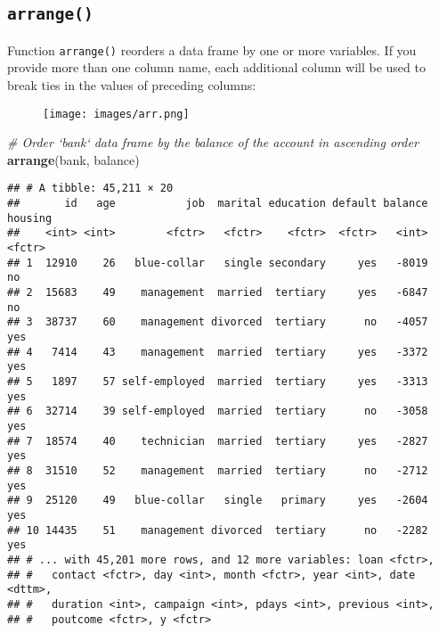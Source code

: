 \documentclass[]{book}
\newenvironment{Shaded}{\begin{snugshade}}{\end{snugshade}}
\newcommand{\KeywordTok}[1]{\textcolor[rgb]{0.13,0.29,0.53}{\textbf{{#1}}}}
\newcommand{\StringTok}[1]{\textcolor[rgb]{0.31,0.60,0.02}{{#1}}}
\newcommand{\CommentTok}[1]{\textcolor[rgb]{0.56,0.35,0.01}{\textit{{#1}}}}
\newcommand{\NormalTok}[1]{{#1}}
\begin{document}
\subsection{\texorpdfstring{\texttt{arrange()}}{arrange()}}\label{arrange}

Function \texttt{arrange()} reorders a data frame by one or more
variables. If you provide more than one column name, each additional
column will be used to break ties in the values of preceding columns:

\begin{figure}[htbp]
\centering
\texttt{[image: images/arr.png]}
\caption{}
\end{figure}

\begin{Shaded}
\begin{Highlighting}[]
\CommentTok{# Order `bank` data frame by the balance of the account in ascending order}
\KeywordTok{arrange}\NormalTok{(bank, balance)}
\end{Highlighting}
\end{Shaded}

\begin{verbatim}
## # A tibble: 45,211 × 20
##       id   age           job  marital education default balance housing
##    <int> <int>        <fctr>   <fctr>    <fctr>  <fctr>   <int>  <fctr>
## 1  12910    26   blue-collar   single secondary     yes   -8019      no
## 2  15683    49    management  married  tertiary     yes   -6847      no
## 3  38737    60    management divorced  tertiary      no   -4057     yes
## 4   7414    43    management  married  tertiary     yes   -3372     yes
## 5   1897    57 self-employed  married  tertiary     yes   -3313     yes
## 6  32714    39 self-employed  married  tertiary      no   -3058     yes
## 7  18574    40    technician  married  tertiary     yes   -2827     yes
## 8  31510    52    management  married  tertiary      no   -2712     yes
## 9  25120    49   blue-collar   single   primary     yes   -2604     yes
## 10 14435    51    management divorced  tertiary      no   -2282     yes
## # ... with 45,201 more rows, and 12 more variables: loan <fctr>,
## #   contact <fctr>, day <int>, month <fctr>, year <int>, date <dttm>,
## #   duration <int>, campaign <int>, pdays <int>, previous <int>,
## #   poutcome <fctr>, y <fctr>
\end{verbatim}

\begin{Shaded}
\end{Shaded}
\end{document}
